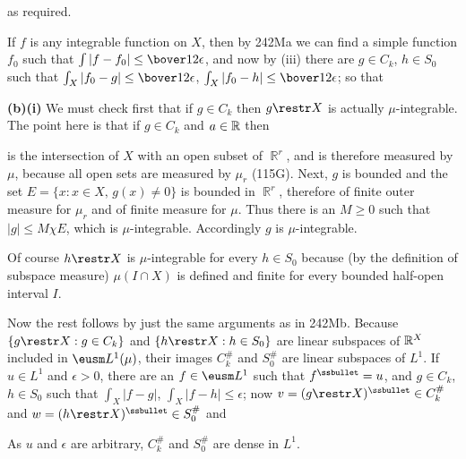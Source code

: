 {

\noindent as required.

\medskip

 If $f$ is any integrable function on $X$, then by
242Ma
we can find a simple function $f_0$ such that
$\int|f-f_0|\le\bover12\epsilon$, and now by (iii) there are
$g\in C_k$, $h\in S_0$ such that
$\int_X|f_0-g|\le\bover12\epsilon$,
$\int_X|f_0-h|\le\bover12\epsilon$;  so that




\medskip

{\bf (b)(i)} We must check first that if $g\in C_k$
then $g\restr X$ is
actually $\mu$-integrable.   The point here is that if $g\in C_k$ and
$a\in\Bbb R$ then


\noindent is the intersection of $X$ with an open subset of $\BbbR^r$,
and is therefore measured by $\mu$, because all open sets are measured
by $\mu_r$ (115G).   Next, $g$ is bounded and the set
$E=\{x:x\in X,\,g(x)\ne 0\}$ is bounded in $\BbbR^r$, therefore of
finite outer
measure for $\mu_r$ and of finite measure for $\mu$.   Thus there is
an
$M\ge 0$ such that $|g|\le M\chi E$, which is $\mu$-integrable.
Accordingly $g$ is $\mu$-integrable.

Of course $h\restr X$ is $\mu$-integrable for every $h\in S_0$
because (by the
definition of subspace measure) $\mu(I\cap X)$ is defined and finite
for
every bounded half-open interval $I$.
\medskip

 Now the rest follows by just the same arguments as in
242Mb.   Because $\{g\restr X:g\in C_k\}$ and
$\{h\restr X:h\in S_0\}$ are linear subspaces of $\Bbb R^X$
included in $\eusm L^1(\mu)$, their images $C_k^{\#}$ and $S_0^{\#}$
are
linear subspaces of $L^1$.
If $u\in L^1$ and $\epsilon>0$, there are an $f\in\eusm L^1$ such that
$f^{\ssbullet}=u$, and  $g\in C_k$, $h\in S_0$ such that
$\int_X|f-g|$, $\int_X|f-h|\le\epsilon$;  now
$v=(g\restr X)^{\ssbullet}\in C_k^{\#}$
and $w=(h\restr X)^{\ssbullet}\in S_0^{\#}$ and


\noindent As $u$ and $\epsilon$ are arbitrary, $C_k^{\#}$ and
$S_0^{\#}$ are dense in $L^1$.
}%

